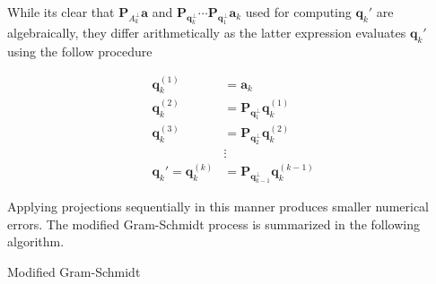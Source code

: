 While its clear that $\bm{P}_{A_{k}^{\perp}} \bm{a} $ and $\bm{P}_{\bm{q}_{k}^{\perp}} \cdots \bm{P}_{\bm{q}_{1}^{\perp}} \bm{a}_k$ used for computing $\bm{q}_k'$ are algebraically, they differ arithmetically as the latter expression evaluates $\bm{q}_k'$ using the follow procedure

\begin{align*}
    \bm{q}_k^{(1)}             & = \bm{a}_k                                       \\
    \bm{q}_k^{(2)}             & = \bm{P}_{\bm{q}_{1}^{\perp}} \bm{q}_k^{(1)}     \\
    \bm{q}_k^{(3)}             & = \bm{P}_{\bm{q}_{2}^{\perp}} \bm{q}_k^{(2)}     \\
                               & \vdots                                           \\
    \bm{q}_k' = \bm{q}_k^{(k)} & = \bm{P}_{\bm{q}_{k-1}^{\perp}} \bm{q}_k^{(k-1)}
\end{align*}

Applying projections sequentially in this manner produces smaller numerical errors. The modified Gram-Schmidt process \cite{TrefethenLloydN.LloydNicholas1997Nla/,DemmelJamesW1997Anla} is summarized in the following algorithm.

    {\centering
        \begin{minipage}{.85\linewidth}
            \begin{algorithm}[H]
                \caption{Modified Gram-Schmidt}
                \label{alg: Modified_Gram-Schmidt}
                \SetAlgoLined
                \DontPrintSemicolon

                \BlankLine
                \BlankLine
            \end{algorithm}
        \end{minipage}
        \par
    }